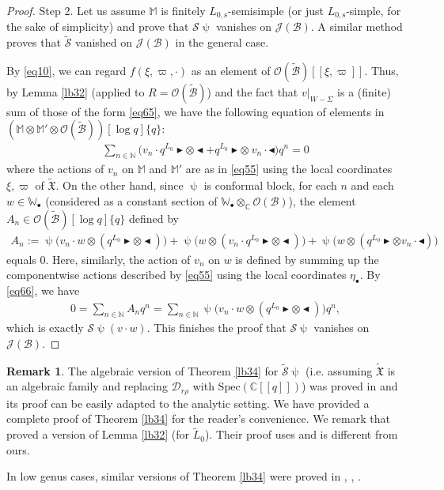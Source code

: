 \documentclass[11pt,b5paper,notitlepage]{article}
\theoremstyle{definition}
\newtheorem{rem}[df]{Remark}
\theoremstyle{plain}
\newcommand{\fk}{\mathfrak}
\newcommand{\mc}{\mathcal}
\newcommand{\wtd}{\widetilde}
\newcommand{\scr}{\mathscr}
\newcommand{\blt}{\bullet}
\newcommand{\Wbb}{\mathbb W}
\newcommand{\Mbb}{\mathbb M}
\newcommand{\Cbb}{\mathbb C}
\newcommand{\Nbb}{\mathbb N}
\newcommand{\btl}{\blacktriangleleft}
\newcommand{\btr}{\blacktriangleright}
\newcommand{\Lss}{{L_{0,\mathrm{s}}}}
\numberwithin{equation}{section}
\begin{document}
\begin{proof}
	
Step 2. Let us assume $\Mbb$ is finitely $\Lss$-semisimple (or just $\Lss$-simple, for the sake of simplicity) and prove that $\mc S\uppsi$ vanishes on $\scr J(\mc B)$. A similar method proves that $\wtd{\mc S}$ vanished on $\scr J(\mc B)$ in  the general case. 

By \eqref{eq10}, we can regard $f(\xi,\varpi,\cdot)$ as an element of $\scr O(\wtd{\mc B})[[\xi,\varpi]]$. Thus, by Lemma \ref{lb32} (applied to $R=\scr O(\wtd{\mc B})$) and the fact that $v|_{W-\Sigma}$ is a (finite) sum of those of the form \eqref{eq65}, we have the following equation of elements in $(\Mbb\otimes\Mbb'\otimes \scr O(\wtd{\mc B}))[\log q]\{q\}$:
	\begin{align}
	\sum_{n\in\Nbb}\big(v_{n}\cdot q^{L_0}\btr\otimes\btl+ q^{L_0}\btr\otimes~ v_{n}\cdot\btl\big)q^{n} =0\label{eq66}
	\end{align}
	where the actions of $v_{n}$ on $\Mbb$ and $\Mbb'$ are as in \eqref{eq55} using the  local coordinates $\xi,\varpi$ of $\wtd{\fk X}$. On the other hand, since $\uppsi$ is  conformal block, for each $n$ and each $w\in\Wbb_\blt$ (considered as a constant section of $\Wbb_\blt\otimes_\Cbb\scr O(\mc B)$), the element $A_{n}\in\scr O(\wtd{\mc B})[\log q]\{q\}$ defined by
	\begin{align*}
	A_{n}:=\uppsi\big(v_{n}\cdot w\otimes (q^{L_0}\btr\otimes\btl)\big)+\uppsi\big(w\otimes (v_n\cdot q^{L_0}\btr\otimes\btl)\big)+\uppsi\big(w\otimes ( q^{L_0}\btr\otimes v_n\cdot\btl)\big)
	\end{align*}
	equals $0$. Here, similarly, the action of $v_{n}$ on $w$ is defined by summing up the componentwise actions described by \eqref{eq55} using the local coordinates $\eta_\blt$.  By \eqref{eq66}, we have
	\begin{align*}
	0=\sum_{n\in\Nbb}A_{n}q^{n}=\sum_{n\in\Nbb}\uppsi\big(v_{n}\cdot w\otimes (q^{L_0}\btr\otimes\btl)\big)q^n,
	\end{align*}
	which is exactly $\mc S\uppsi(v\cdot w)$. This finishes the proof that $\mc S\uppsi$ vanishes on $\scr J(\mc B)$.
\end{proof}



\begin{rem}
The algebraic version of  Theorem \ref{lb34} for $\wtd{\mc S}\uppsi$ (i.e. assuming $\wtd{\fk X}$ is an algebraic family and replacing $\mc D_{r\rho}$ with $\mathrm{Spec}(\Cbb[[q]])$) was proved in \cite[Thm. 8.5.1]{DGT19b} and its proof can be easily adapted to the analytic setting. We have provided a complete proof of Theorem \ref{lb34} for the reader's convenience. We remark that \cite{DGT19b}  proved a version of Lemma \ref{lb32} (for $\wtd L_0$). Their proof uses \cite[Lemma 8.7.1]{NT05} and is different from ours.

In low genus cases, similar versions of Theorem \ref{lb34} were proved in \cite[Prop. 4.3.6]{Zhu96}, \cite[Thm. 1.4]{Hua05a}, \cite[Prop. 3.6]{Hua05b}.
\end{rem}
\end{document}
